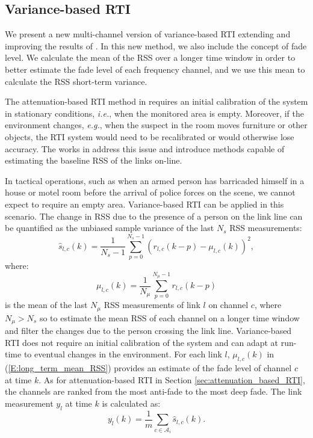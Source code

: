 \documentclass[conference]{IEEEtran}
\begin{document}
\subsection{Variance-based RTI} \label{sec:variance_based_RTI}

We present a new multi-channel version of variance-based RTI extending
and improving the results of \cite{Wilson_VRTI_2011}. In this new
method, we also include the concept of fade level. We calculate the
mean of the RSS over a longer time window in order to better estimate
the fade level of each frequency channel, and we use this mean to
calculate the RSS short-term variance.

The attenuation-based RTI method in \cite{MASS} requires an initial
calibration of the system in stationary conditions, \emph{i.e.}, when
the monitored area is empty. Moreover, if the environment changes,
\emph{e.g.}, when the suspect in the room moves furniture or other
objects, the RTI system would need to be recalibrated or would
otherwise lose accuracy. The works in
\cite{Grandma_2012,Edelstein_2010} address this issue and introduce
methods capable of estimating the baseline RSS of the links on-line.

In tactical operations, such as when an armed person has barricaded
himself in a house or motel room before the arrival of police forces
on the scene, we cannot expect to require an empty
area. Variance-based RTI can be applied in this scenario. The change
in RSS due to the presence of a person on the link line can be
quantified as the unbiased sample variance of the last $N_s$ RSS
measurements:
\begin{equation}\label{E:short_term_variance_RSS}
\hat{s}_{l,c}(k) = \frac{1}{N_s-1} {\sum_{p=0}^{N_s-1}} \left( r_{l,c}(k-p)- \mu_{l,c}(k) \right)^2,
\end{equation}
where:
\begin{equation}\label{E:long_term_mean_RSS}
\mu_{l,c}(k) = \frac{1}{N_{\mu}} {\sum_{p=0}^{N_{\mu}-1}} r_{l,c}(k-p)
\end{equation}
is the mean of the last $N_{\mu}$ RSS measurements of link $l$ on
channel $c$, where $N_{\mu} > N_s$ so to estimate the mean RSS of each
channel on a longer time window and filter the changes due to the
person crossing the link line. Variance-based RTI does not require an
initial calibration of the system and can adapt at run-time to
eventual changes in the environment. For each link $l$, $\mu_{l,c}(k)$
in (\ref{E:long_term_mean_RSS}) provides an estimate of the fade level
of channel $c$ at time $k$. As for attenuation-based RTI in Section
\ref{sec:attenuation_based_RTI}, the channels are ranked from the most
anti-fade to the most deep fade. The link measurement $y_l$ at time
$k$ is calculated as:
\begin{equation}\label{E:MASS_RSS_change_var}
y_{l}(k) =  \frac{1}{m} \sum_{c \in \mathcal{A}_i} \hat{s}_{l,c}(k).
\end{equation}
\end{document}
